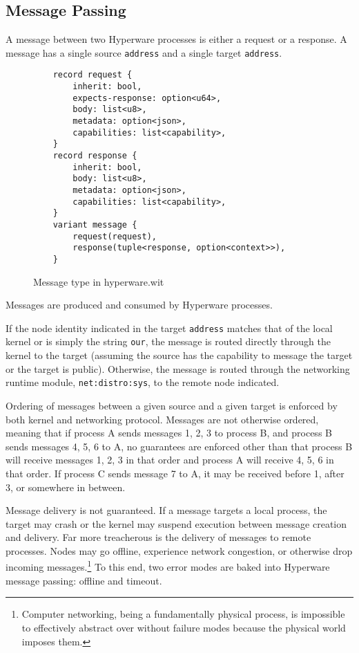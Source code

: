 \documentclass[runningheads]{llncs}
\begin{document}
\subsection{Message Passing}
\label{sec:osmessagepassing}

A message between two Hyperware processes is either a request or a response.
A message has a single source \verb|address| and a single target \verb|address|.

\begin{figure}[H]
    \centering
    \begin{verbatim}
    record request {
        inherit: bool,
        expects-response: option<u64>,
        body: list<u8>,
        metadata: option<json>,
        capabilities: list<capability>,
    }
    record response {
        inherit: bool,
        body: list<u8>,
        metadata: option<json>,
        capabilities: list<capability>,
    }
    variant message {
        request(request),
        response(tuple<response, option<context>>),
    }
    \end{verbatim}
    \caption{Message type in hyperware.wit}
    \label{fig:WIT Types 2}
\end{figure}

Messages are produced and consumed by Hyperware processes.

If the node identity indicated in the target \verb|address| matches that of the local kernel or is simply the string \verb|our|, the message is routed directly through the kernel to the target (assuming the source has the capability to message the target or the target is public).
Otherwise, the message is routed through the networking runtime module, \verb|net:distro:sys|, to the remote node indicated.

Ordering of messages between a given source and a given target is enforced by both kernel and networking protocol.
Messages are not otherwise ordered, meaning that if process A sends messages 1, 2, 3 to process B, and process B sends messages 4, 5, 6 to A, no guarantees are enforced other than that process B will receive messages 1, 2, 3 in that order and process A will receive 4, 5, 6 in that order.
If process C sends message 7 to A, it may be received before 1, after 3, or somewhere in between.

Message delivery is not guaranteed.
If a message targets a local process, the target may crash or the kernel may suspend execution between message creation and delivery.
Far more treacherous is the delivery of messages to remote processes.
Nodes may go offline, experience network congestion, or otherwise drop incoming messages.\footnote{Computer networking, being a fundamentally physical process, is impossible to effectively abstract over without failure modes because the physical world imposes them.}
To this end, two error modes are baked into Hyperware message passing: offline and timeout.
\end{document}
